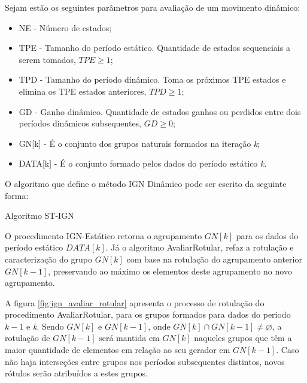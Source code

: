 Sejam estão os seguintes parâmetros para avaliação de um movimento dinâmico:
\begin{itemize}
    \item NE - Número de estados;
    \item TPE - Tamanho do período estático. Quantidade de estados sequenciais a serem tomados, ${TPE \geqslant 1}$;
    \item TPD - Tamanho do período dinâmico. Toma os próximos TPE estados e elimina os TPE estados anteriores, ${TPD \geqslant 1}$;
    \item GD - Ganho dinâmico. Quantidade de estados ganhos ou perdidos entre dois períodos dinâmicos subsequentes, ${GD \geqslant 0}$;
    \item GN[k] - É o conjunto dos grupos naturais formados na iteração \textit{k};
    \item DATA[k] - É o conjunto formado pelos dados do período estático \textit{k}.
\end{itemize}

O algoritmo que define o método \acrshort{IGN} Dinâmico pode ser escrito da seguinte forma:

\begin{algorithm}[!ht]
	\SetSpacedAlgorithm
	\caption{\label{alg:algoritmo_stign}Algoritmo \acrshort{ST-IGN}}
	\Inicio{
	    i = TPE\;
	    k = 1\;
	    s = 0\;
	    \Enqto{${s \geqslant NE}$}{
    	    \Se {${s = 0}$} {
	            ${t_1 = 1}$\;
    	    }
    	    \Senao {
    	        ${t_1 = t_1 + TPD}$\;
    	    }
    	    ${t_2 = t_1 + TPE + GD - 1}$\;
    	    ${DATA[k] = \{ I_s, s = t_1, ..., t_2 \} }$\;
    	    IGN-Estatico(${DATA[k], GN[k]}$)\;
    	    AvaliarRotular(${GN[k]}$, ${GN[[k-1]}$)\;
    	    ${k = k + 1}$\;
	    }
	}
\end{algorithm}

O procedimento IGN-Estático retorna o agrupamento ${GN[k]}$ para os dados do período estático ${DATA[k]}$. Já o algoritmo AvaliarRotular, refaz a rotulação e caracterização do grupo ${GN[k]}$ com base na rotulação do agrupamento anterior ${GN[k - 1]}$, preservando ao máximo os elementos deste agrupamento no novo agrupamento.

A figura \ref{fig:ign_avaliar_rotular} apresenta o processo de rotulação do procedimento AvaliarRotular, para os grupos formados para dados do período ${k - 1}$ e \textit{k}. Sendo ${GN[k]}$ e ${GN[k - 1]}$, onde ${GN[k] \cap GN[k - 1] \neq \varnothing 
}$, a rotulação de ${GN[k - 1]}$ será mantida em ${GN[k]}$ naqueles grupos que têm a maior quantidade de elementos em relação ao seu gerador em ${GN[k - 1]}$. Caso não haja interseções entre grupos nos períodos subsequentes distintos, novos rótulos serão atribuídos a estes grupos.

